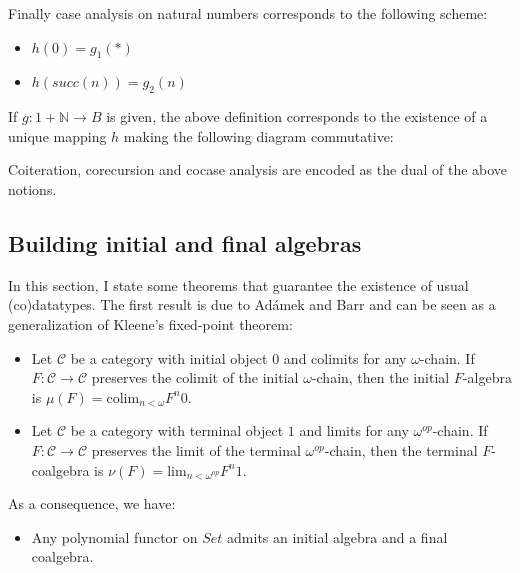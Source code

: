 \documentclass[notitlepage]{article}
\begin{document}
Finally case analysis on natural numbers corresponds to the following scheme:

\begin{itemize}
	\item $h(0) = g_1(*)$
	\item $h(succ(n)) = g_2(n)$
\end{itemize}

If $g: 1 + \mathbb{N} \to B$ is given, the above definition corresponds to the existence of a unique mapping $h$ making the following diagram commutative:


Coiteration, corecursion and cocase analysis are encoded as the dual of the above notions.

\subsection{Building initial and final algebras}

In this section, I state some theorems that guarantee the existence of usual (co)datatypes. The first result is due to Adámek and Barr and can be seen as a generalization of Kleene's fixed-point theorem:

\begin{itemize}
	\item Let $\mathcal{C}$ be a category with initial object $0$ and colimits for any $\omega$-chain. If $F: \mathcal{C} \to \mathcal{C}$ preserves the colimit of the initial $\omega$-chain, then the initial $F$-algebra is $\mu(F) = \text{colim}_{n < \omega} F^n 0$.
	\item Let $\mathcal{C}$ be a category with terminal object $1$ and limits for any $\omega^{op}$-chain. If $F: \mathcal{C} \to \mathcal{C}$ preserves the limit of the terminal $\omega^{op}$-chain, then the terminal $F$-coalgebra is $\nu(F) = \text{lim}_{n < \omega^{op}} F^n 1$.
\end{itemize}

As a consequence, we have:

\begin{itemize}
	\item Any polynomial functor on $Set$ admits an initial algebra and a final coalgebra.
\end{itemize}
\end{document}
